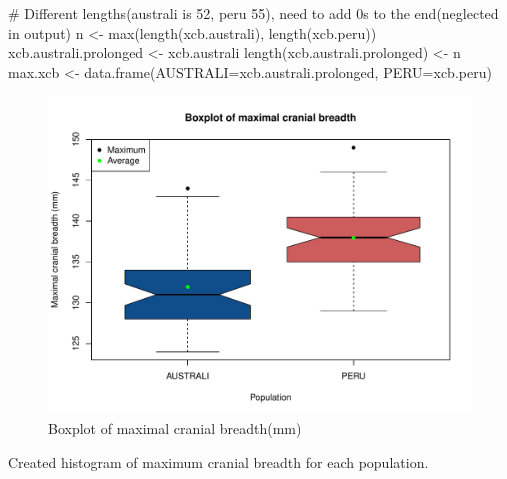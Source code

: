 \documentclass[12pt, oneside]{report}\usepackage[]{graphicx}\usepackage[]{color}
\begin{document}
\begin{Schunk}
\begin{Sinput}
# Different lengths(australi is 52, peru 55), need to add 0s to the end(neglected in output)
n <- max(length(xcb.australi), length(xcb.peru))
xcb.australi.prolonged <- xcb.australi
length(xcb.australi.prolonged) <- n
max.xcb <- data.frame(AUSTRALI=xcb.australi.prolonged, PERU=xcb.peru)
\end{Sinput}
\end{Schunk}
\begin{Schunk}
\begin{figure}[h]

{\centering \includegraphics[width=.6\textheight,height=.45\textheight]{figure/unnamed-chunk-5-1} 

}

\caption[Boxplot of maximal cranial breadth(mm)]{Boxplot of maximal cranial breadth(mm)}\label{fig:unnamed-chunk-5}
\end{figure}
\end{Schunk}

\newpage
Created histogram of maximum cranial breadth for each population.
\end{document}
